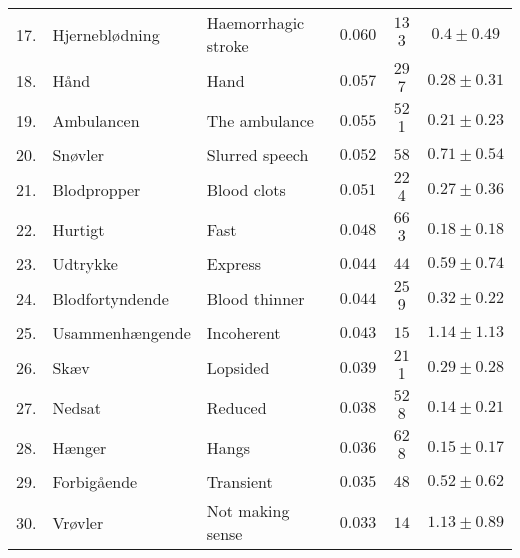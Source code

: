 {\begin{table}
{\begin{tabular}{l|llccc}
        17. & Hjerneblødning & Haemorrhagic stroke & $0.060$ & $13$3 & $0.4 \pm 0.49$ \\
        18. & Hånd & Hand & $0.057$ & $29$7 & $0.28 \pm 0.31$ \\
        19. & Ambulancen & The ambulance & $0.055$ & $52$1 & $0.21 \pm 0.23$ \\
        20. & Snøvler & Slurred speech & $0.052$ & $58$ & $0.71 \pm 0.54$ \\
        21. & Blodpropper & Blood clots & $0.051$ & $22$4 & $0.27 \pm 0.36$ \\
        22. & Hurtigt & Fast & $0.048$ & $66$3 & $0.18 \pm 0.18$ \\
        23. & Udtrykke & Express & $0.044$ & $44$ & $0.59 \pm 0.74$ \\
        24. & Blodfortyndende & Blood thinner & $0.044$ & $25$9 & $0.32 \pm 0.22$ \\
        25. & Usammenhængende & Incoherent & $0.043$ & $15$ & $1.14 \pm 1.13$ \\
        26. & Skæv & Lopsided & $0.039$ & $21$1 & $0.29 \pm 0.28$ \\
        27. & Nedsat & Reduced & $0.038$ & $52$8 & $0.14 \pm 0.21$ \\
        28. & Hænger & Hangs & $0.036$ & $62$8 & $0.15 \pm 0.17$ \\
        29. & Forbigående & Transient & $0.035$ & $48$ & $0.52 \pm 0.62$ \\
        30. & Vrøvler & Not making sense & $0.033$ & $14$ & $1.13 \pm 0.89$ \\
        \bottomrule
    \end{tabular}%
    }
\end{table}

}
